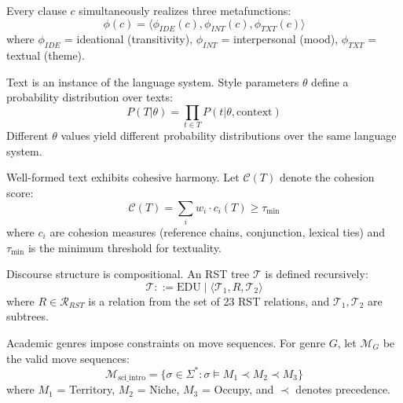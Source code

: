 \begin{axiom}
\label{ax:swsm-3}
Every clause $c$ simultaneously realizes three metafunctions:
\begin{equation}
\phi(c) = \langle \phi_{IDE}(c), \phi_{INT}(c), \phi_{TXT}(c) \rangle
\end{equation}
where $\phi_{IDE}$ = ideational (transitivity), $\phi_{INT}$ = interpersonal (mood), $\phi_{TXT}$ = textual (theme).
\end{axiom}

\begin{axiom}
\label{ax:swsm-4}
Text is an instance of the language system. Style parameters $\theta$ define a probability distribution over texts:
\begin{equation}
P(T | \theta) = \prod_{t \in T} P(t | \theta, \text{context})
\end{equation}
Different $\theta$ values yield different probability distributions over the same language system.
\end{axiom}

\begin{axiom}
\label{ax:swsm-5}
Well-formed text exhibits cohesive harmony. Let $\mathcal{C}(T)$ denote the cohesion score:
\begin{equation}
\mathcal{C}(T) = \sum_{i} w_i \cdot c_i(T) \geq \tau_{\min}
\end{equation}
where $c_i$ are cohesion measures (reference chains, conjunction, lexical ties) and $\tau_{\min}$ is the minimum threshold for textuality.
\end{axiom}

\begin{axiom}
\label{ax:swsm-6}
Discourse structure is compositional. An RST tree $\mathcal{T}$ is defined recursively:
\begin{equation}
\mathcal{T} ::= \text{EDU} \mid \langle \mathcal{T}_1, R, \mathcal{T}_2 \rangle
\end{equation}
where $R \in \mathcal{R}_{RST}$ is a relation from the set of 23 RST relations, and $\mathcal{T}_1, \mathcal{T}_2$ are subtrees.
\end{axiom}

\begin{axiom}
\label{ax:swsm-7}
Academic genres impose constraints on move sequences. For genre $G$, let $\mathcal{M}_G$ be the valid move sequences:
\begin{equation}
\mathcal{M}_{\text{sci\_intro}} = \{ \sigma \in \Sigma^* : \sigma \models M_1 \prec M_2 \prec M_3 \}
\end{equation}
where $M_1$ = Territory, $M_2$ = Niche, $M_3$ = Occupy, and $\prec$ denotes precedence.
\end{axiom}

